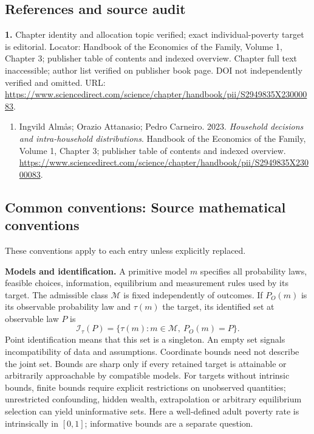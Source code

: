 \documentclass[11pt,a4paper]{article}
\begin{document}
\subsection*{References and source audit}
\textbf{1.} Chapter identity and allocation topic verified; exact individual-poverty target is editorial. Locator: Handbook of the Economics of the Family, Volume 1, Chapter 3; publisher table of contents and indexed overview. Chapter full text inaccessible; author list verified on publisher book page. DOI not independently verified and omitted. URL: \url{https://www.sciencedirect.com/science/chapter/handbook/pii/S2949835X23000083}.
\begin{enumerate}\raggedright
\item\hypertarget{definitions:source:30007740:1}{} Ingvild Almås; Orazio Attanasio; Pedro Carneiro. 2023. \emph{Household decisions and intra-household distributions}. Handbook of the Economics of the Family, Volume 1, Chapter 3; publisher table of contents and indexed overview.
\url{https://www.sciencedirect.com/science/chapter/handbook/pii/S2949835X23000083}.
\end{enumerate}

\subsection*{Common conventions: Source mathematical conventions}

These conventions apply to each entry unless explicitly replaced.

\textbf{Models and identification.} A primitive model \(m\) specifies all probability laws, feasible choices, information, equilibrium and measurement rules used by its target. The admissible class \(\mathcal M\) is fixed independently of outcomes. If \(P_O(m)\) is its observable probability law and \(\tau(m)\) the target, its identified set at observable law \(P\) is
\[
 \mathcal I_\tau(P)=\{\tau(m):m\in\mathcal M,\ P_O(m)=P\}.
\]
Point identification means that this set is a singleton. An empty set signals incompatibility of data and assumptions. Coordinate bounds need not describe the joint set. Bounds are sharp only if every retained target is attainable or arbitrarily approachable by compatible models. For targets without intrinsic bounds, finite bounds require explicit restrictions on unobserved quantities; unrestricted confounding, hidden wealth, extrapolation or arbitrary equilibrium selection can yield uninformative sets. Here a well-defined adult poverty rate is intrinsically in \([0,1]\); informative bounds are a separate question.
\end{document}
